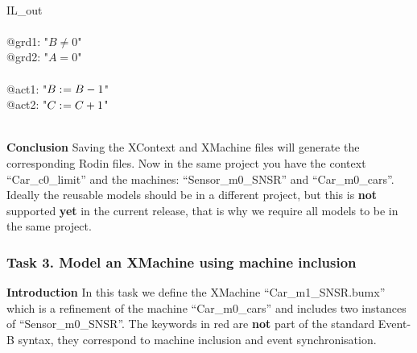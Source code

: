 \begin{description}
\begin{center}
\begin{Bcode}
			\Btab \Bend\\
			\Btab IL_out\\
			\Btab \Bwhen\\
			\Btab \Btab @grd1: "\(B \neq 0\)"\\
			\Btab \Btab @grd2: "\(A = 0\)"\\
			\Btab \Bthen\\
			\Btab \Btab @act1: "\(B \mathrel{:\mkern1mu=} B - 1\)"\\
			\Btab \Btab @act2: "\(C \mathrel{:\mkern1mu=} C + 1\)"\\
			\Btab \Bend\\
			\Bend
			\fi
		\end{Bcode}
	\end{center}
	
\end{description}
\textbf{Conclusion} Saving the XContext and XMachine files will generate the corresponding Rodin files. Now in the same project you have the context ``Car\_c0\_limit'' and the machines: ``Sensor\_m0\_SNSR'' and ``Car\_m0\_cars''. Ideally the reusable models should be in a different project, but this is \textbf{not} supported \textbf{yet} in the current release, that is why we require all models to be in the same project.


\subsubsection{Task 3. Model an XMachine using machine inclusion}
\textbf{Introduction} In this task we define the XMachine ``Car\_m1\_SNSR.bumx'' which is a refinement of the machine ``Car\_m0\_cars'' and includes two instances of ``Sensor\_m0\_SNSR''. The keywords in red  are \textbf{not} part of the standard Event-B syntax, they correspond to machine inclusion and event synchronisation. 

